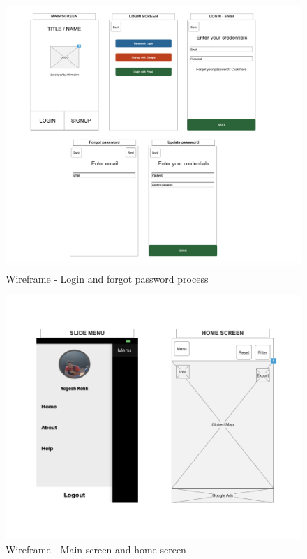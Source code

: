     \begin{figure}[H]
            \centering
            \includegraphics[width=1.0\linewidth]{figures/ch3/wireframe_2.png}
            \caption{\label{fig:wireframe_2} Wireframe - Login and forgot password process}
    \end{figure}
    
    \begin{figure}[H]
            \centering
            \includegraphics[width=1.0\linewidth]{figures/ch3/wireframe_3.png}
            \caption{\label{fig:wireframe_3} Wireframe - Main screen and home screen}
    \end{figure}


